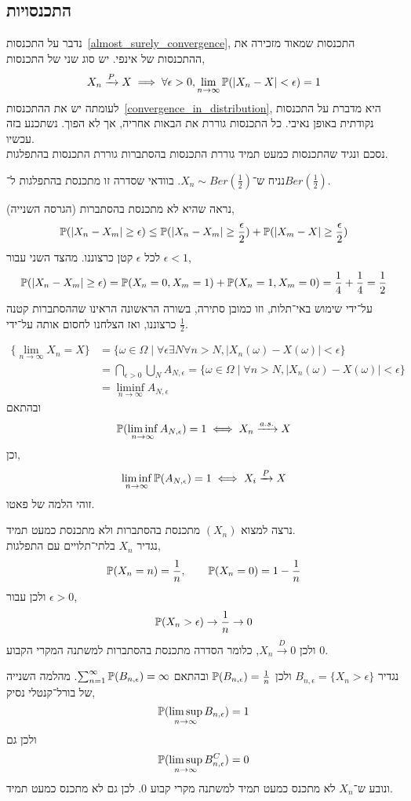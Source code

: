 \subsection{התכנסויות}
נדבר על התכנסות\ \ref{almost_surely_convergence}, התכנסות שמאוד מזכירה את ההתכנסות של אינפי.
יש סוג שני של התכנסות,
\[
	X_n \xrightarrow{P} X \implies \forall \epsilon > 0, \lim_{n \to \infty} \mathbb{P}(|X_n - X| < \epsilon) = 1
\]
לעומתה יש את ההתכנסות\ \ref{convergence_in_distribution}, היא מדברת על התכנסות נקודתית באופן נאיבי.
כל התכנסות גוררת את הבאות אחריה, אך לא הפוך. נשתכנע בזה עכשיו. \\
נסכם ונגיד שהתכנסות כמעט תמיד גוררת התכנסות בהסתברות גוררת התכנסות בהתפלגות.
\begin{example}
	נניח ש־$X_n \sim Ber(\frac{1}{2})$.
	בוודאי שסדרה זו מתכנסת בהתפלגות ל־$Ber(\frac{1}{2})$.

	נראה שהיא לא מתכנסת בהסתברות (הגרסה השנייה),
	\[
		\mathbb{P}(|X_n - X_m| \ge \epsilon)
		\le \mathbb{P}(|X_n - X_m| \ge \frac{\epsilon}{2}) + \mathbb{P}(|X_m - X| \ge \frac{\epsilon}{2})
	\]
	לכל $\epsilon$ קטן כרצוננו.
	מהצד השני עבור $\epsilon < 1$,
	\[
		\mathbb{P}(|X_n - X_m| \ge \epsilon)
		= \mathbb{P}(X_n = 0, X_m = 1) + \mathbb{P}(X_n = 1, X_m = 0)
		= \frac{1}{4} + \frac{1}{4} = \frac{1}{2}
	\]
	על־ידי שימוש באי־תלות, וזו כמובן סתירה, בשורה הראשונה הראינו שההסתברות קטנה כרצוננו, ואז הצלחנו לחסום אותה על־ידי $\frac{1}{2}$.
\end{example}
\begin{example}
	\begin{align*}
		\{ \lim_{n \to \infty} X_n = X \}
		& = \{ \omega \in \Omega \mid \forall \epsilon \exists N \forall n > N, |X_n(\omega) - X(\omega)| < \epsilon \} \\
		& = \bigcap_{\epsilon > 0} \bigcup_{N} A_{N, \epsilon} = \{ \omega \in \Omega \mid \forall n > N, |X_n(\omega) - X(\omega)| < \epsilon \} \\
		& = \liminf_{n \to \infty} A_{N, \epsilon}
	\end{align*}
	ובהתאם
	\[
		\mathbb{P}(\liminf_{n \to \infty} A_{N, \epsilon}) = 1 \iff X_n \xrightarrow{a.s.} X
	\]
	וכן,
	\[
		\liminf_{n \to \infty} \mathbb{P}(A_{N, \epsilon}) = 1 \iff X_i \xrightarrow{P} X
	\]
	זוהי הלמה של פאטו.
\end{example}
\begin{example}
	נרצה למצוא $(X_n)$ מתכנסת בהסתברות ולא מתכנסת כמעט תמיד. \\
	נגדיר $X_n$ בלתי־תלויים עם התפלגות,
	\[
		\mathbb{P}(X_n = n) = \frac{1}{n},
		\qquad
		\mathbb{P}(X_n = 0) = 1 - \frac{1}{n}
	\]
	ולכן עבור $\epsilon > 0$,
	\[
		\mathbb{P}(X_n > \epsilon) \to \frac{1}{n} \to 0
	\]
	ולכן $X_n \xrightarrow{D} 0$, כלומר הסדרה מתכנסת בהסתברות למשתנה המקרי הקבוע $0$.

	נגדיר $B_{n, \epsilon} = \{ X_n > \epsilon \}$ ולכן $\mathbb{P}(B_{n, \epsilon}) = \frac{1}{n}$ ובהתאם $\sum_{n = 1}^{\infty} \mathbb{P}(B_{n, \epsilon}) = \infty$.
	מהלמה השנייה של בורל־קנטלי נסיק,
	\[
		\mathbb{P}(\limsup_{n \to \infty} B_{n, \epsilon}) = 1
	\]
	ולכן גם
	\[
		\mathbb{P}(\limsup_{n \to \infty} B_{n, \epsilon}^C) = 0
	\]
	ונובע ש־$X_n$ לא מתכנס כמעט תמיד למשתנה מקרי קבוע $0$.
	לכן גם לא מתכנס כמעט תמיד.
\end{example}

